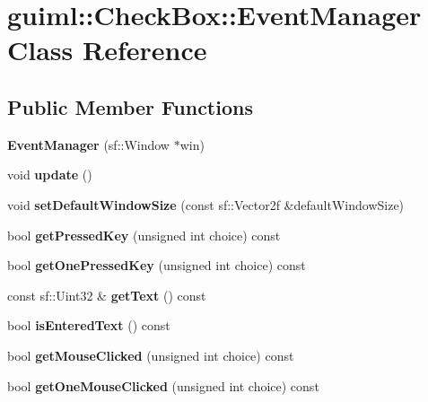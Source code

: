 \section{guiml\-:\-:Check\-Box\-:\-:Event\-Manager Class Reference}
\label{classguiml_1_1_check_box_1_1_event_manager}
\subsection*{Public Member Functions}
\begin{DoxyCompactItemize}
\item 
{\bfseries Event\-Manager} (sf\-::\-Window $\ast$win)\label{classguiml_1_1_check_box_1_1_event_manager_a66a469eefa034091baad89a778650db9}

\item 
void {\bfseries update} ()\label{classguiml_1_1_check_box_1_1_event_manager_af30540350c852a60fef54781c9fa9d3c}

\item 
void {\bfseries set\-Default\-Window\-Size} (const sf\-::\-Vector2f \&default\-Window\-Size)\label{classguiml_1_1_check_box_1_1_event_manager_adc72d7f06f88ae5d3719831e807a1a33}

\item 
bool {\bfseries get\-Pressed\-Key} (unsigned int choice) const \label{classguiml_1_1_check_box_1_1_event_manager_a6619c9e927272be2a6138958196f8999}

\item 
bool {\bfseries get\-One\-Pressed\-Key} (unsigned int choice) const \label{classguiml_1_1_check_box_1_1_event_manager_ac63a84605c905535585352dd46a4cd28}

\item 
const sf\-::\-Uint32 \& {\bfseries get\-Text} () const \label{classguiml_1_1_check_box_1_1_event_manager_adefa240869002939d40368c14d97f2ce}

\item 
bool {\bfseries is\-Entered\-Text} () const \label{classguiml_1_1_check_box_1_1_event_manager_a9e663671e183fbc161d2d863b7514208}

\item 
bool {\bfseries get\-Mouse\-Clicked} (unsigned int choice) const \label{classguiml_1_1_check_box_1_1_event_manager_a13f97c0397337fe385c084bbea871821}

\item 
bool {\bfseries get\-One\-Mouse\-Clicked} (unsigned int choice) const \label{classguiml_1_1_check_box_1_1_event_manager_a74bf1f4fcb43868f2d8ee32598711816}


\end{DoxyCompactItemize}
